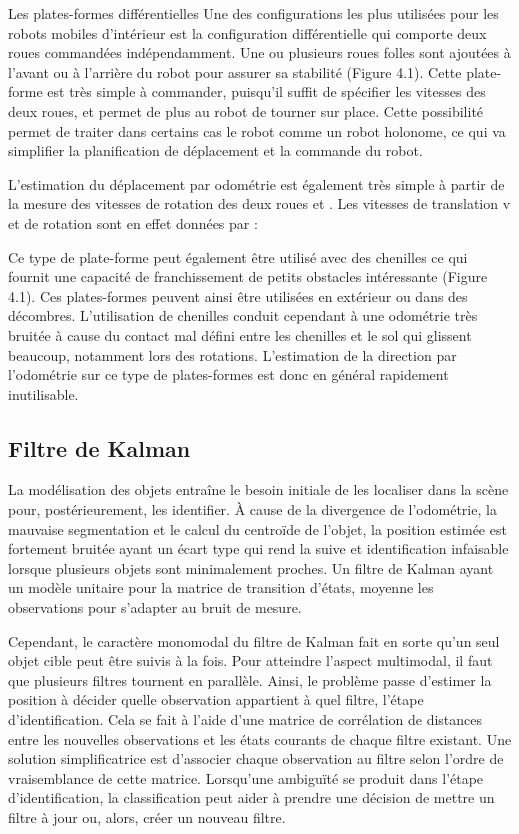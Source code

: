 Les plates-formes différentielles Une des configurations les plus utilisées pour les robots mobiles d’intérieur est la configuration différentielle qui comporte deux roues commandées indépendamment. Une ou plusieurs roues folles sont ajoutées à l’avant ou à l’arrière du robot pour assurer sa stabilité (Figure 4.1). Cette plate-forme est très simple à commander, puisqu’il suffit de spécifier les vitesses des deux roues, et permet de plus au robot de tourner sur place. Cette possibilité permet de traiter dans certains cas le robot comme un robot holonome, ce qui va simplifier la planification de déplacement et la commande du robot.

L’estimation du déplacement par odométrie est également très simple à partir de la mesure des vitesses de rotation des deux roues et . Les vitesses de translation v et de rotation sont en effet données par :

Ce type de plate-forme peut également être utilisé avec des chenilles ce qui fournit une capacité de franchissement de petits obstacles intéressante (Figure 4.1). Ces plates-formes peuvent ainsi être utilisées en extérieur ou dans des décombres. L’utilisation de chenilles conduit cependant à une odométrie très bruitée à cause du contact mal défini entre les chenilles et le sol qui glissent beaucoup, notamment lors des rotations. L’estimation de la direction par l’odométrie sur ce type de plates-formes est donc en général rapidement inutilisable.

\subsection{Filtre de Kalman }

La modélisation des objets entraîne le besoin initiale de les
localiser dans la scène pour, postérieurement, les identifier. À cause
de la divergence de l'odométrie, la mauvaise segmentation et le calcul
du centroïde de l'objet, la position estimée est fortement bruitée
ayant un écart type qui rend la suive et identification infaisable
lorsque plusieurs objets sont minimalement proches. Un filtre de
Kalman ayant un modèle unitaire pour la matrice de transition d'états,
moyenne les observations pour s'adapter au bruit de mesure.

Cependant, le caractère monomodal du filtre de Kalman fait en sorte
qu'un seul objet cible peut être suivis à la fois. Pour atteindre
l'aspect multimodal, il faut que plusieurs filtres tournent en
parallèle. Ainsi, le problème passe d’estimer la position à décider
quelle observation appartient à quel filtre, l'étape
d'identification. Cela se fait à l'aide d'une matrice de corrélation
de distances entre les nouvelles observations et les états courants de
chaque filtre existant. Une solution simplificatrice est d'associer
chaque observation au filtre selon l'ordre de vraisemblance de cette
matrice. Lorsqu’une ambiguïté se produit dans l'étape
d'identification, la classification peut aider à prendre une décision
de mettre un filtre à jour ou, alors, créer un nouveau filtre.

